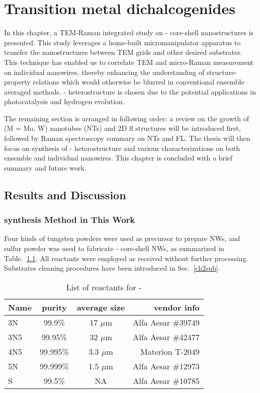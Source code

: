 
\chapter{Transition metal dichalcogenides}

In this chapter, a TEM-Raman integrated study on - core-shell nanostructures is presented. This study leverages a home-built micromanipulator apparatus to transfer the nanostructures between TEM grids and other desired substrates. This technique has enabled us to correlate TEM and micro-Raman measurement on individual nanowires, thereby enhancing the understanding of structure-property relations which would otherwise be blurred in conventional ensemble averaged methods. - heterostructure is chosen due to the potential applications in photocatalysis and hydrogen evolution. 

The remaining section is arranged in following order: a review on the growth of  (M = Mo, W) nanotubes (NTs) and 2D \gls{fl} structures will be introduced first, followed by Raman spectroscopy summary on  NTs and FL. The thesis will then focus on synthesis of - heterostructure and various characterizations on both ensemble and individual nanowires. This chapter is concluded with a brief summary and future work.



\section{Results and Discussion}

\subsection{synthesis Method in This Work}

Four kinds of tungsten powders were used as precursor to prepare  NWs, and sulfur powder was used to fabricate - core-shell NWs, as summarized in Table.~\ref{tab:ch5pre}. All reactants were employed as received without further processing. Substrates cleaning procedures have been introduced in Sec.~\ref{ch2sub}. 

\begin{table}[htb]
\centering
\caption{List of reactants for -}\label{tab:ch5pre}
\begin{tabular}{lccr}
\toprule
Name & purity & average size & vendor info\\
\midrule
3N   &  99.9\% & 17 $\mu$m & Alfa Aesar \#39749\\
3N5   &  99.95\% & 32 $\mu$m  & Alfa Aesar \#42477\\
4N5   &  99.995\% & 3.3 $\mu$m  & Materion T-2049 \\
5N   &  99.999\% & 1.5 $\mu$m & Alfa Aesar \#12973\\
S    &   99.5\%  &  NA  & Alfa Aesar \#10785\\
\bottomrule
\end{tabular}
\end{table}

